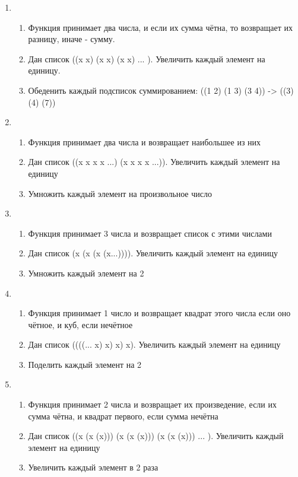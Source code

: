 \documentclass[a4paper,12pt]{article}
\begin{document}
\begin{enumerate}
	\item \begin{enumerate}
		\item Функция принимает два числа, и если их сумма чётна, то возвращает их разницу, иначе - сумму.
		\item Дан список ((x x) (x x) (x x) ... ). Увеличить каждый элемент на единицу.
		\item Обеденить каждый подсписок суммированием: ((1 2) (1 3) (3 4)) -> ((3) (4) (7))
	\end{enumerate}

	\item \begin{enumerate}
		\item Функция принимает два числа и возвращает наибольшее из них
		\item Дан список ((x x x x ...) (x x x x ...)). Увеличить каждый элемент на единицу
		\item Умножить каждый элемент на произвольное число
	\end{enumerate}

	\item \begin{enumerate}
		\item Функция принимает 3 числа и возвращает список с этими числами
		\item Дан список (x (x (x (x...)))). Увеличить каждый элемент на единицу
		\item Умножить каждый элемент на 2
	\end{enumerate}

	\item \begin{enumerate}
		\item Функция принимает 1 число и возвращает квадрат этого числа если оно чётное, и куб, если нечётное
		\item Дан список ((((... x) x) x) x). Увеличить каждый элемент на единицу
		\item Поделить каждый элемент на 2
	\end{enumerate}

	\item \begin{enumerate}
		\item Функция принимает 2 числа и возвращает их произведение, если их сумма чётна, и квадрат первого, если сумма нечётна
		\item Дан список ((x (x (x))) (x (x (x))) (x (x (x))) ... ). Увеличить каждый элемент на единицу
		\item Увеличить каждый элемент в 2 раза
	\end{enumerate}


\end{enumerate}
\end{document}
